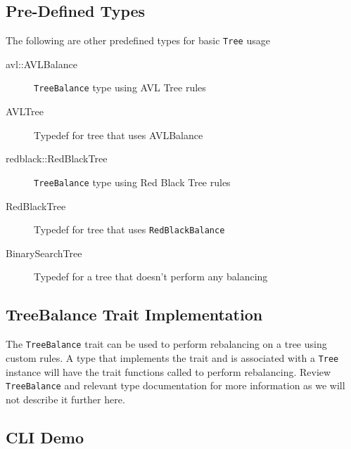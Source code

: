 \documentclass[11pt, letterpaper]{article}
\begin{document}
\subsection{Pre-Defined Types}
The following are other predefined types for basic \texttt{Tree} usage
\begin{description}
    \item[avl::AVLBalance] \texttt{TreeBalance} type using AVL Tree rules
    \item[AVLTree] Typedef for tree that uses AVLBalance
    \item[redblack::RedBlackTree] \texttt{TreeBalance} type using Red Black Tree rules
    \item[RedBlackTree] Typedef for tree that uses  \texttt{RedBlackBalance}
    \item[BinarySearchTree] Typedef for a tree that doesn't perform any balancing
\end{description}

\subsection{TreeBalance Trait Implementation}
The \texttt{TreeBalance} trait can be used to perform rebalancing on a tree using custom rules.
A type that implements the trait and is associated with a \texttt{Tree} instance will have the trait functions called
to perform rebalancing.  Review \texttt{TreeBalance} and relevant type documentation for more information as we will not
describe it further here.

\subsection{CLI Demo}
\end{document}
